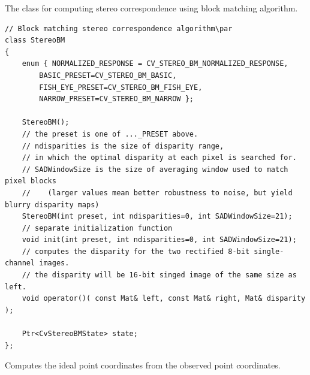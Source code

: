 The class for computing stereo correspondence using block matching algorithm.

\begin{lstlisting}
// Block matching stereo correspondence algorithm\par
class StereoBM
{
    enum { NORMALIZED_RESPONSE = CV_STEREO_BM_NORMALIZED_RESPONSE,
        BASIC_PRESET=CV_STEREO_BM_BASIC,
        FISH_EYE_PRESET=CV_STEREO_BM_FISH_EYE,
        NARROW_PRESET=CV_STEREO_BM_NARROW };

    StereoBM();
    // the preset is one of ..._PRESET above.
    // ndisparities is the size of disparity range,
    // in which the optimal disparity at each pixel is searched for.
    // SADWindowSize is the size of averaging window used to match pixel blocks
    //    (larger values mean better robustness to noise, but yield blurry disparity maps)
    StereoBM(int preset, int ndisparities=0, int SADWindowSize=21);
    // separate initialization function
    void init(int preset, int ndisparities=0, int SADWindowSize=21);
    // computes the disparity for the two rectified 8-bit single-channel images.
    // the disparity will be 16-bit singed image of the same size as left.
    void operator()( const Mat& left, const Mat& right, Mat& disparity );

    Ptr<CvStereoBMState> state;
};
\end{lstlisting}


Computes the ideal point coordinates from the observed point coordinates.

\begin{description}
\end{description}

